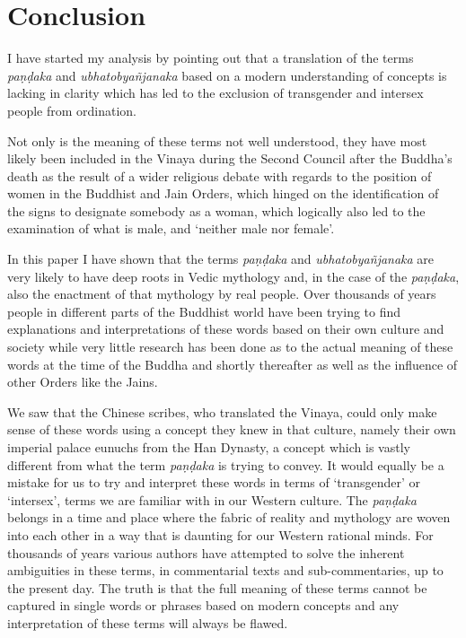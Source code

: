 \section{Conclusion}
I have started my analysis by pointing out that a translation of the terms {\em paṇḍaka} and {\em ubhatob­yañ­janaka} based on a modern understanding of concepts is lacking in clarity which has led to the exclusion of transgender and intersex people from ordination.

Not only is the meaning of these terms not well understood, they have most likely been included in the Vinaya during the Second Council after the Buddha's death as the result of a wider religious debate with regards to the position of women in the Buddhist and Jain Orders, which hinged on the identification of the signs to designate somebody as a woman, which logically also led to the examination of what is male, and `neither male nor female'.

In this paper I have shown that the terms {\em paṇḍaka} and {\em ubhatob­yañ­janaka} are very likely to have deep roots in Vedic mythology and, in the case of the {\em paṇḍaka}, also the enactment of that mythology by real people. Over thousands of years people in different parts of the Buddhist world have been trying to find explanations and interpretations of these words based on their own culture and society while very little research has been done as to the actual meaning of these words at the time of the Buddha and shortly thereafter as well as the influence of other Orders like the Jains. 

We saw that the Chinese scribes, who translated the Vinaya, could only make sense of these words using a concept they knew in that culture, namely their own imperial palace eunuchs from the Han Dynasty, a concept which is vastly different from what the term {\em paṇḍaka} is trying to convey. It would equally be a mistake for us to try and interpret these words in terms of `transgender' or `intersex', terms we are familiar with in our Western culture. The {\em paṇḍaka} belongs in a time and place where the fabric of reality and mythology are woven into each other in a way that is daunting for our Western rational minds. For thousands of years various authors have attempted to solve the inherent ambiguities in these terms, in commentarial texts and sub-commentaries, up to the present day. The truth is that the full meaning of these terms cannot be captured in single words or phrases based on modern concepts and any interpretation of these terms will always be flawed.

